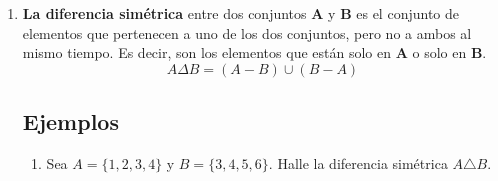 \documentclass[12pt]{article}
\begin{document}
\begin{enumerate}
\begin{enumerate}
    \item Sea \(A = \{\text{Ana},\ \text{Luis},\ \text{Pedro},\ \text{Carla}\}\)
    y \(B = \{\text{Luis},\ \text{Carla}\}\).  
    Encuentre \(A - B\).

    
    \[
    A - B = \{\text{Ana},\ \text{Pedro}\}
    \]

\end{enumerate}


\item \textbf{La diferencia simétrica} entre dos conjuntos \textbf{A} y \textbf{B} es el conjunto de elementos que pertenecen a uno de los dos conjuntos, pero no a ambos al mismo tiempo. Es decir, son los elementos que están solo en \textbf{A }o solo en \textbf{B}.
    $$A\Delta B = (A-B)\cup (B-A)$$
   
    \begin{center}
    \end{center}
    
\subsection*{Ejemplos}
\begin{enumerate}

    \item Sea \(A = \{1, 2, 3, 4\}\) 
    y \(B = \{3, 4, 5, 6\}\).  
    Halle la diferencia simétrica \(A \triangle B\).


\end{enumerate}
\end{enumerate}
\end{document}
